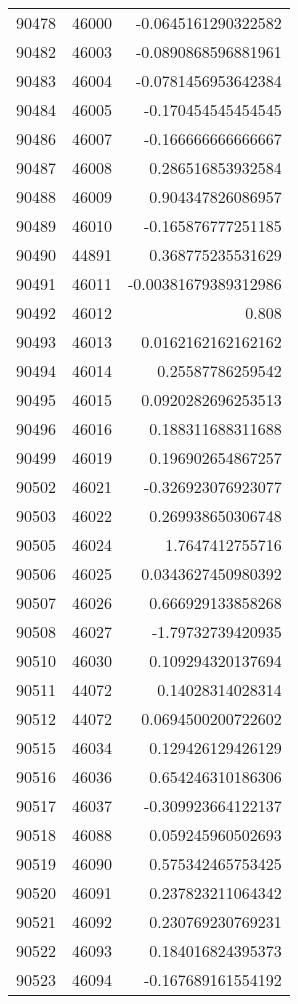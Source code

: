 \begin{tabular}{r | r | r}
90478 & 46000 & -0.0645161290322582 \\
90482 & 46003 & -0.0890868596881961 \\
90483 & 46004 & -0.0781456953642384 \\
90484 & 46005 & -0.170454545454545 \\
90486 & 46007 & -0.166666666666667 \\
90487 & 46008 & 0.286516853932584 \\
90488 & 46009 & 0.904347826086957 \\
90489 & 46010 & -0.165876777251185 \\
90490 & 44891 & 0.368775235531629 \\
90491 & 46011 & -0.00381679389312986 \\
90492 & 46012 & 0.808 \\
90493 & 46013 & 0.0162162162162162 \\
90494 & 46014 & 0.25587786259542 \\
90495 & 46015 & 0.0920282696253513 \\
90496 & 46016 & 0.188311688311688 \\
90499 & 46019 & 0.196902654867257 \\
90502 & 46021 & -0.326923076923077 \\
90503 & 46022 & 0.269938650306748 \\
90505 & 46024 & 1.7647412755716 \\
90506 & 46025 & 0.0343627450980392 \\
90507 & 46026 & 0.666929133858268 \\
90508 & 46027 & -1.79732739420935 \\
90510 & 46030 & 0.109294320137694 \\
90511 & 44072 & 0.14028314028314 \\
90512 & 44072 & 0.0694500200722602 \\
90515 & 46034 & 0.129426129426129 \\
90516 & 46036 & 0.654246310186306 \\
90517 & 46037 & -0.309923664122137 \\
90518 & 46088 & 0.059245960502693 \\
90519 & 46090 & 0.575342465753425 \\
90520 & 46091 & 0.237823211064342 \\
90521 & 46092 & 0.230769230769231 \\
90522 & 46093 & 0.184016824395373 \\
90523 & 46094 & -0.167689161554192 \\

\end{tabular}
